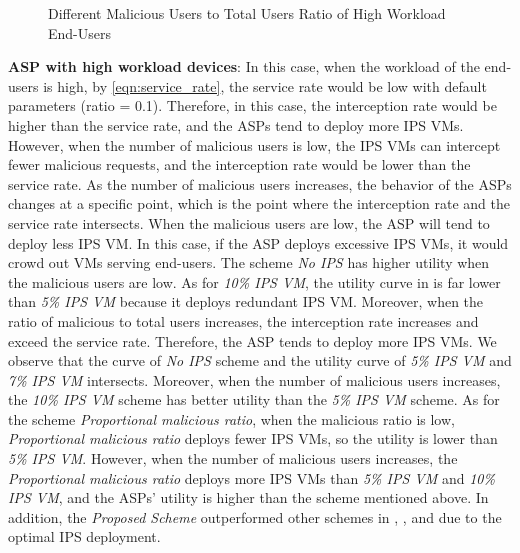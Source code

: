 \documentclass[10pt,journal, compsoc]{IEEEtran}
\begin{document}
\begin{figure}[!]
\captionsetup{justification=centering}
  \hfill
  \hfill
\label{fig:ratio_high}
\caption{Different Malicious Users to Total Users Ratio of High Workload End-Users}
\end{figure}

\textbf{ASP with high workload devices}:  In this case, when the workload of the end-users is high, by \cref{eqn:service_rate}, the service rate would be low with default parameters (ratio = 0.1). Therefore, in this case, the interception rate would be higher than the service rate, and the ASPs tend to deploy more IPS VMs. However, when the number of malicious users is low, the IPS VMs can intercept fewer malicious requests, and the interception rate would be lower than the service rate. As the number of malicious users increases, the behavior of the ASPs changes at a specific point, which is the point where the interception rate and the service rate intersects. When the malicious users are low, the ASP will tend to deploy less IPS VM. In this case, if the ASP deploys excessive IPS VMs, it would crowd out VMs serving end-users. The scheme \textit{No IPS} has higher utility when the malicious users are low. As for \textit{10\% IPS VM}, the utility curve in  is far lower than \textit{5\% IPS VM} because it deploys redundant IPS VM. Moreover, when the ratio of malicious to total users increases, the interception rate increases and exceed the service rate. Therefore, the ASP tends to deploy more IPS VMs. We observe that the curve of \textit{No IPS} scheme and the utility curve of \textit{5\% IPS VM} and \textit{7\% IPS VM} intersects. Moreover, when the number of malicious users increases, the \textit{10\% IPS VM} scheme has better utility than the \textit{5\% IPS VM} scheme. As for the scheme \textit{Proportional malicious ratio}, when the malicious ratio is low, \textit{Proportional malicious ratio} deploys fewer IPS VMs, so the utility is lower than \textit{5\% IPS VM}. However, when the number of malicious users increases, the \textit{Proportional malicious ratio} deploys more IPS VMs than \textit{5\% IPS VM} and \textit{10\% IPS VM}, and the ASPs' utility is higher than the scheme mentioned above. In addition, the \textit{Proposed Scheme} outperformed other schemes in , , and  due to the optimal IPS deployment.
\end{document}
